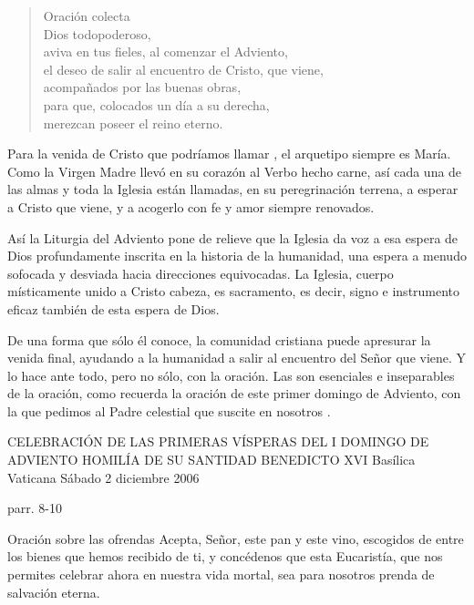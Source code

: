 \begin{patercite}
	\begin{quote}
		Oración colecta
		\\Dios todopoderoso,
		\\aviva en tus fieles, al comenzar el Adviento,
		\\el deseo de salir al encuentro de Cristo, que viene,
		\\acompañados por las buenas obras,
		\\para que, colocados un día a su derecha,
		\\merezcan poseer el reino eterno.
	\end{quote}
	Para la venida de Cristo que podríamos llamar , el arquetipo siempre es María. Como la Virgen Madre llevó en su corazón al Verbo hecho carne, así cada una de las almas y toda la Iglesia están llamadas, en su peregrinación terrena, a esperar a Cristo que viene, y a acogerlo con fe y amor siempre renovados.
	
	Así la Liturgia del Adviento pone de relieve que la Iglesia da voz a esa espera de Dios profundamente inscrita en la historia de la humanidad, una espera a menudo sofocada y desviada hacia direcciones equivocadas. La Iglesia, cuerpo místicamente unido a Cristo cabeza, es sacramento, es decir, signo e instrumento eficaz también de esta espera de Dios.
	
	De una forma que sólo él conoce, la comunidad cristiana puede apresurar la venida final, ayudando a la humanidad a salir al encuentro del Señor que viene. Y lo hace ante todo, pero no sólo, con la oración. Las  son esenciales e inseparables de la oración, como recuerda la oración de este primer domingo de Adviento, con la que pedimos al Padre celestial que suscite en nosotros .
	
	CELEBRACIÓN DE LAS PRIMERAS VÍSPERAS DEL I DOMINGO DE ADVIENTO
	HOMILÍA DE SU SANTIDAD BENEDICTO XVI
	Basílica Vaticana
	Sábado 2 diciembre 2006
	
	parr. 8-10
	
	
	
	Oración sobre las ofrendas
	Acepta, Señor, este pan y este vino,
	escogidos de entre los bienes
	que hemos recibido de ti,
	y concédenos que esta Eucaristía,
	que nos permites celebrar ahora
	en nuestra vida mortal,
	sea para nosotros prenda de salvación eterna. 
	

\end{patercite}
